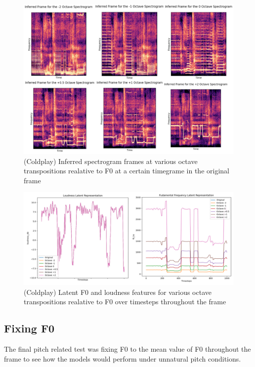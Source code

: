 \begin{figure}[H]
    \centering
    \includegraphics[width=\textwidth]{research/results/Coldplay/InferredTranspositions.png}
    \caption{(Coldplay) Inferred spectrogram frames at various octave transpositions realative to F0 at a certain timegrame in the original frame}
\end{figure}

\begin{figure}[H]
    \centering
    \includegraphics[width=\textwidth]{research/results/Coldplay/InferredTranspositionsGraphs.png}
    \caption{(Coldplay) Latent F0 and loudness features for various octave transpositions realative to F0 over timesteps throughout the frame}
\end{figure}

\subsection{Fixing F0}

The final pitch related test was fixing F0 to the mean value of F0 throughout the frame to see how the models would perform under unnatural pitch conditions.

